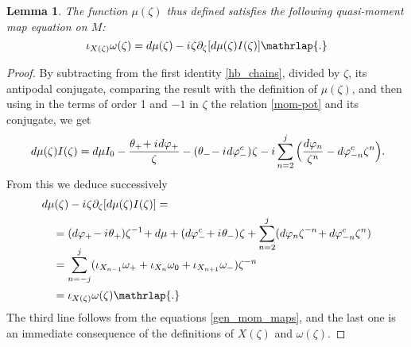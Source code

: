 \documentclass[11pt]{amsart}
\newtheorem{lemma}[theorem]{Lemma}
\theoremstyle{remark}
\theoremstyle{remark}
\theoremstyle{definition}
\theoremstyle{definition}
\theoremstyle{definition}
\newcommand{\0}{{\scriptstyle 0'}} %
\newcommand{\1}{{\scriptstyle 1'}}
\newcommand{\hp}{\hspace{0.5pt}} %
\begin{document}
\begin{lemma} \label{qmm_twist_mu}
The function $\mu(\zeta)$ thus defined satisfies the following quasi-moment map equation on $M$:
\begin{equation}
\iota_{X(\zeta)}\omega(\zeta) = d\mu(\zeta) - i \hp \zeta \partial_{\zeta}[d\mu(\zeta)I(\zeta)] \mathrlap{.}
\end{equation}
\end{lemma}

\begin{proof}

By subtracting from the first identity \eqref{hb_chains}, divided by $\zeta$, its antipodal conjugate, comparing the result with the definition of $\mu(\zeta)$, and then using in the  terms of order 1 and $-1$ in $\zeta$ the relation \eqref{mom-pot} and its conjugate, we get
\begin{equation} \label{d_mu_I}
d\mu(\zeta)I(\zeta) = d\mu I_0 - \frac{\theta_+\! + i \hp d\varphi_+}{\zeta} - (\theta_-\! - i \hp d\varphi^c_-) \hp \zeta - i \sum_{n=2}^j\Big(\frac{d\varphi_n}{\zeta^{n}} - d\varphi^c_{-n}\zeta^n\Big) \rlap{.}
\end{equation}
From this we deduce successively \smallskip
{\allowdisplaybreaks
\begin{align}
& d\mu(\zeta) - i \hp \zeta \partial_{\zeta}[d\mu(\zeta)I(\zeta)] = \\
& \quad = (d\varphi_+ \!- i\hp \theta_+)\zeta^{-1} \!+ d\mu +(d\varphi^c_- \!+ i \hp \theta_-) \hp \zeta + \sum_{n=2}^j(d\varphi_n\zeta^{-n} \! + d\varphi^c_{-n}\zeta^n) \nonumber \\[-7pt]
& \quad = \sum_{n=-j}^j (\iota_{X_{n-1}}\omega_+ + \iota_{X_{n}}\omega_0 + \iota_{X_{n+1}}\omega_-) \zeta^{-n} \nonumber \\[1pt]
& \quad = \iota_{X(\zeta)} \omega(\zeta) \mathrlap{.} \nonumber
\end{align}
}%
The third line  follows from the equations \eqref{gen_mom_maps}, and the last one is an immediate consequence of the definitions of $X(\zeta)$ and $\omega(\zeta)$.
\end{proof}
\end{document}
